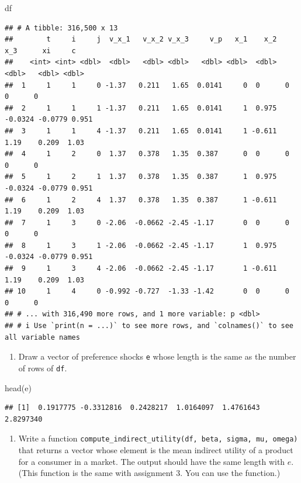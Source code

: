 \documentclass[
]{book}
\newenvironment{Shaded}{\begin{snugshade}}{\end{snugshade}}
\newcommand{\FunctionTok}[1]{\textcolor[rgb]{0.00,0.00,0.00}{#1}}
\newcommand{\NormalTok}[1]{#1}
\providecommand{\tightlist}{%
  \setlength{\itemsep}{0pt}\setlength{\parskip}{0pt}}
\begin{document}
\begin{Shaded}
\begin{Highlighting}[]
\NormalTok{df}
\end{Highlighting}
\end{Shaded}

\begin{verbatim}
## # A tibble: 316,500 x 13
##        t     i     j  v_x_1   v_x_2 v_x_3     v_p   x_1    x_2     x_3      xi     c
##    <int> <int> <dbl>  <dbl>   <dbl> <dbl>   <dbl> <dbl>  <dbl>   <dbl>   <dbl> <dbl>
##  1     1     1     0 -1.37   0.211   1.65  0.0141     0  0      0       0      0    
##  2     1     1     1 -1.37   0.211   1.65  0.0141     1  0.975 -0.0324 -0.0779 0.951
##  3     1     1     4 -1.37   0.211   1.65  0.0141     1 -0.611  1.19    0.209  1.03 
##  4     1     2     0  1.37   0.378   1.35  0.387      0  0      0       0      0    
##  5     1     2     1  1.37   0.378   1.35  0.387      1  0.975 -0.0324 -0.0779 0.951
##  6     1     2     4  1.37   0.378   1.35  0.387      1 -0.611  1.19    0.209  1.03 
##  7     1     3     0 -2.06  -0.0662 -2.45 -1.17       0  0      0       0      0    
##  8     1     3     1 -2.06  -0.0662 -2.45 -1.17       1  0.975 -0.0324 -0.0779 0.951
##  9     1     3     4 -2.06  -0.0662 -2.45 -1.17       1 -0.611  1.19    0.209  1.03 
## 10     1     4     0 -0.992 -0.727  -1.33 -1.42       0  0      0       0      0    
## # ... with 316,490 more rows, and 1 more variable: p <dbl>
## # i Use `print(n = ...)` to see more rows, and `colnames()` to see all variable names
\end{verbatim}

\begin{enumerate}
\def\labelenumi{\arabic{enumi}.}
\setcounter{enumi}{5}
\tightlist
\item
  Draw a vector of preference shocks \texttt{e} whose length is the same as the number of rows of \texttt{df}.
\end{enumerate}

\begin{Shaded}
\begin{Highlighting}[]
\FunctionTok{head}\NormalTok{(e)}
\end{Highlighting}
\end{Shaded}

\begin{verbatim}
## [1]  0.1917775 -0.3312816  0.2428217  1.0164097  1.4761643  2.8297340
\end{verbatim}

\begin{enumerate}
\def\labelenumi{\arabic{enumi}.}
\setcounter{enumi}{6}
\tightlist
\item
  Write a function \texttt{compute\_indirect\_utility(df,\ beta,\ sigma,\ mu,\ omega)} that returns a vector whose element is the mean indirect utility of a product for a consumer in a market. The output should have the same length with \(e\). (This function is the same with assignment 3. You can use the function.)
\end{enumerate}
\end{document}
